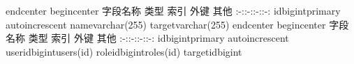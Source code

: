 {}\markdownRendererBackslash{}end\markdownRendererLeftBrace{}center\markdownRendererRightBrace{}\markdownRendererInterblockSeparator
{}\markdownRendererInterblockSeparator
{}\markdownRendererBackslash{}begin\markdownRendererLeftBrace{}center\markdownRendererRightBrace{}\markdownRendererInterblockSeparator
{}\markdownRendererPipe{} 字段名称 \markdownRendererPipe{} 类型 \markdownRendererPipe{} 索引 \markdownRendererPipe{} 外键 \markdownRendererPipe{} 其他 \markdownRendererPipe{} \markdownRendererPipe{}:-:\markdownRendererPipe{}:-:\markdownRendererPipe{}:-:\markdownRendererPipe{}:-:\markdownRendererPipe{} \markdownRendererPipe{}id\markdownRendererPipe{}bigint\markdownRendererPipe{}primary\markdownRendererPipe{}\markdownRendererPipe{} auto\markdownRendererBackslash{}\markdownRendererUnderscore{}increscent\markdownRendererPipe{} \markdownRendererPipe{}name\markdownRendererPipe{}varchar(255)\markdownRendererPipe{}\markdownRendererPipe{}\markdownRendererPipe{}\markdownRendererPipe{} \markdownRendererPipe{}target\markdownRendererPipe{}varchar(255)\markdownRendererPipe{}\markdownRendererPipe{}\markdownRendererPipe{}\markdownRendererPipe{}\markdownRendererInterblockSeparator
{}\markdownRendererBackslash{}end\markdownRendererLeftBrace{}center\markdownRendererRightBrace{}\markdownRendererInterblockSeparator
{}\markdownRendererInterblockSeparator
{}\markdownRendererBackslash{}begin\markdownRendererLeftBrace{}center\markdownRendererRightBrace{}\markdownRendererInterblockSeparator
{}\markdownRendererPipe{} 字段名称 \markdownRendererPipe{} 类型 \markdownRendererPipe{} 索引 \markdownRendererPipe{} 外键 \markdownRendererPipe{} 其他 \markdownRendererPipe{} \markdownRendererPipe{}:-:\markdownRendererPipe{}:-:\markdownRendererPipe{}:-:\markdownRendererPipe{}:-:\markdownRendererPipe{} \markdownRendererPipe{}id\markdownRendererPipe{}bigint\markdownRendererPipe{}primary\markdownRendererPipe{}\markdownRendererPipe{} auto\markdownRendererBackslash{}\markdownRendererUnderscore{}increscent\markdownRendererPipe{} \markdownRendererPipe{}user\markdownRendererBackslash{}\markdownRendererUnderscore{}id\markdownRendererPipe{}bigint\markdownRendererPipe{}\markdownRendererPipe{}users(id)\markdownRendererPipe{}\markdownRendererPipe{} \markdownRendererPipe{}role\markdownRendererBackslash{}\markdownRendererUnderscore{}id\markdownRendererPipe{}bigint\markdownRendererPipe{}\markdownRendererPipe{}roles(id)\markdownRendererPipe{}\markdownRendererPipe{} \markdownRendererPipe{}target\markdownRendererBackslash{}\markdownRendererUnderscore{}id\markdownRendererPipe{}bigint\markdownRendererPipe{}\markdownRendererPipe{}\markdownRendererPipe{}\markdownRendererPipe{}\markdownRendererInterblockSeparator
